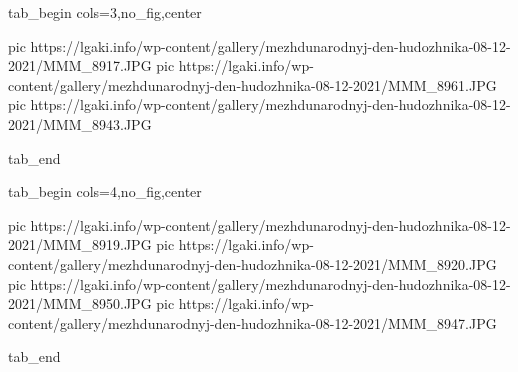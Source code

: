  
 
 
 
 


\ifcmt
  tab_begin cols=3,no_fig,center

     pic https://lgaki.info/wp-content/gallery/mezhdunarodnyj-den-hudozhnika-08-12-2021/MMM_8917.JPG
		 pic https://lgaki.info/wp-content/gallery/mezhdunarodnyj-den-hudozhnika-08-12-2021/MMM_8961.JPG
		 pic https://lgaki.info/wp-content/gallery/mezhdunarodnyj-den-hudozhnika-08-12-2021/MMM_8943.JPG

  tab_end

  tab_begin cols=4,no_fig,center

		pic https://lgaki.info/wp-content/gallery/mezhdunarodnyj-den-hudozhnika-08-12-2021/MMM_8919.JPG
		pic https://lgaki.info/wp-content/gallery/mezhdunarodnyj-den-hudozhnika-08-12-2021/MMM_8920.JPG
		pic https://lgaki.info/wp-content/gallery/mezhdunarodnyj-den-hudozhnika-08-12-2021/MMM_8950.JPG
		pic https://lgaki.info/wp-content/gallery/mezhdunarodnyj-den-hudozhnika-08-12-2021/MMM_8947.JPG

  tab_end
\fi
